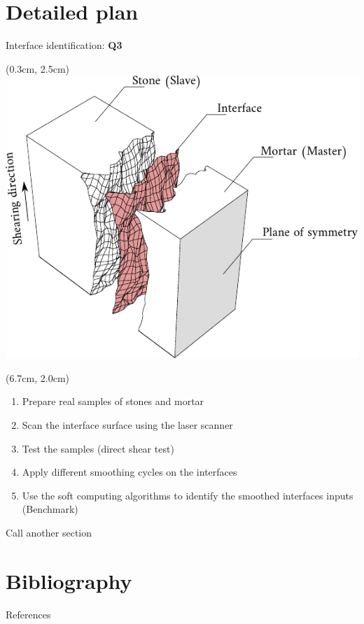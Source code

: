 \documentclass{EESD}
\begin{document}
\section{Detailed plan}


\begin{frame}{Interface identification: \textcolor{myviolet}{\textbf{Q3}}}\vspace{4pt}
    \begin{textblock*}{10cm}(0.3cm, 2.5cm)
        \includegraphics[height = 0.5\textwidth]{Interface.pdf}
    \end{textblock*}
    \begin{textblock*}{10cm}(6.7cm, 2.0cm)
    \begin{enumerate}
        \item Prepare real samples of stones and mortar\vspace{10pt}\pause
        \item Scan the interface surface using the laser scanner\vspace{10pt}\pause
        \item Test the samples (direct shear test)\vspace{10pt}\pause
        \item Apply different smoothing cycles on the interfaces\vspace{10pt}\pause
        \item Use the soft computing algorithms to identify the smoothed interfaces inputs (Benchmark)
    \end{enumerate}
    \end{textblock*}
\end{frame}

\begin{frame}{Call another section}
    
\end{frame}

\breakingframe{
\begin{textblock*}{10cm}(3.2cm,4cm)
\Huge\textbf{\textcolor{black}{Merci de votre attention}}
\end{textblock*}
}
\section{Bibliography}
\begin{frame}{References}\vspace{4pt}
\tiny{\printbibliography}
\end{frame}
\normalsize
\end{document}
